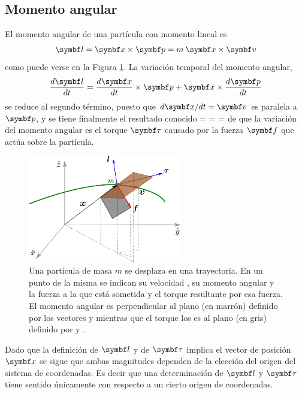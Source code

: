 \documentclass[10pt,oneside]{CBFT_book}
\begin{document}
\subsection{Momento angular}

El momento angular de una partícula con momento lineal  es 
\[
	\vb{l} = \vb{x} \times \vb{p} = m \: \vb{x} \times \vb{v}
\]
como puede verse en la Figura \ref{fig_mc_mom_ang_particula}. 
La variación temporal del momento angular,
\[
	\dtot{\vb{l}}{t} = \dtot{\vb{x}}{t} \times \vb{p} + \vb{x} \times \dtot{\vb{p}}{t} 
\]
se reduce al segundo término, puesto que $ d\vb{x}/dt = \vb{v} $ es paralela a $ \vb{p} $, y
se tiene finalmente el resultado conocido
\be
	 =  \times {} =  \times {} = \vb{\tau}
	\label{conserv_mom_ang}
\ee
de que la variación del momento angular es el torque $\vb{\tau}$ causado por la fuerza $ \vb{f} $ 
que actúa sobre la partícula.

\begin{figure}[hbt]
	\begin{center}
	\includegraphics[width=0.6\textwidth]{images/fig_mc_mom_ang_particula.pdf}	
	\end{center}
	\caption{Una partícula de masa $m$ se desplaza en una trayectoria. En un punto  de la misma se
	indican su velocidad , su momento angular  y la fuerza  a la que está sometida y el
	torque resultante \vb{\tau} por esa fuerza.
	El momento angular es perpendicular al plano (en marrón) definido por los vectores  y  mientras que 
	el torque los es al plano (en gris) definido por  y .}
	\label{fig_mc_mom_ang_particula}
\end{figure} 

Dado que la definición de $ \vb{l} $ y de $ \vb{\tau} $ implica el vector de posición $ \vb{x} $ se sigue que ambas 
magnitudes dependen de la elección del origen del sistema de coordenadas. 
Es decir que una determinación de $ \vb{l} $ y $ \vb{\tau} $ tiene sentido únicamente con respecto a un cierto origen 
de coordenadas.
\end{document}
